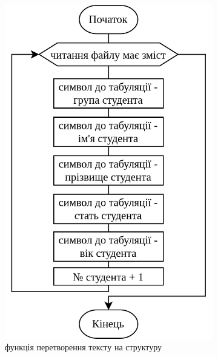 \documentclass[12pt]{extreport}
\begin{document}
\begin{figure}[h]
	\begin{subfigure}[b]{.3\textwidth}
	\centering
		\includegraphics[width=\textwidth]{fch/read.png}
		\caption{функція перетворення тексту на структуру}
	\end{subfigure}
	\hfill
	\begin{subfigure}[b]{.3\textwidth}
	\centering

\end{subfigure}
\end{figure}
\end{document}
